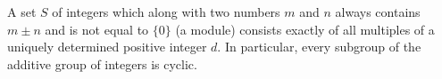 A set $S$ of integers which along with two numbers $m$ and $n$ always contains $m \pm n$ and is not equal to $\{0\}$ (a module) consists exactly of all multiples of a uniquely determined positive integer $d$. In particular, every subgroup of the additive group of integers is cyclic.
